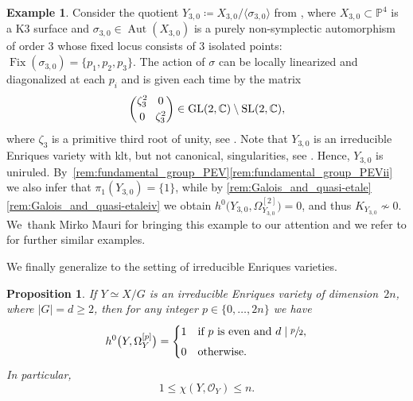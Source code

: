 \documentclass[JEP,XML,SOM,Unicode,published]{cedram}
\theoremstyle{plain}
\newtheorem{prop}[thm]{Proposition}
\theoremstyle{definition}
\newtheorem{exa}[thm]{Example}
\newcommand{\C}{\mathbb{C}}
\renewcommand{\P}{\mathbb{P}}
\newcommand{\OO}{\mathcal{O}}
\DeclareMathOperator{\Aut}{Aut}
\DeclareMathOperator{\Fix}{Fix}
\DeclareMathOperator{\GL}{GL}
\DeclareMathOperator{\SL}{SL}
\begin{document}
\begin{exa}
\label{example:uniruled_Enriques}
Consider the quotient $Y_{3,0} \coloneqq X_{3,0} / \langle \sigma_{3,0} \rangle$ from \cite[Prop.\,4.7]{AS08}, where $X_{3,0} \subset \P^4$ is a K3 surface and $\sigma_{3,0} \in \Aut(X_{3,0})$ is a purely non-symplectic automorphism of order $3$ whose fixed locus consists of $3$ isolated points:
$ \Fix(\sigma_{3,0}) = \{ p_1, p_2, p_3 \} $. The action of $\sigma$ can be locally linearized and diagonalized at each $p_i$ and is given each time by the matrix
\[\arraycolsep3.5pt
\begin{pmatrix}
\zeta_3^2 & 0 \\[0.25em]
0 & \zeta_3^2
\end{pmatrix}
\in \GL(2,\C) \setminus \SL(2,\C),
\]
where $\zeta_3$ is a primitive third root of unity, see \cite[\S 2]{AS08}.
Note that $Y_{3,0}$ is an irreducible Enriques variety with klt, but not canonical, singularities, see \cite[Prop.\,4.18, Th.\,4.20 and Rem.\,4.21(1)]{KM98}. Hence, $Y_{3,0}$ is uniruled. By~\autoref{rem:fundamental_group_PEV}\eqref{rem:fundamental_group_PEVii} we also infer that $\pi_1 (Y_{3,0}) = \{ 1 \}$, while by \autoref{rem:Galois_and_quasi-etale}\eqref{rem:Galois_and_quasi-etaleiv} we obtain
\hbox{$h^0 \bigl(Y_{3,0},\Omega_{Y_{3,0}}^{[2]} \bigr) \!=\! 0$}, and thus $K_{Y_{3,0}} \not\sim 0$. We~thank Mirko Mauri for bringing this example to our attention and we refer to \cite{AST11,BrandhorstHofmann23} for further similar examples.
\end{exa}

We finally generalize \cite[Prop.\,2.6]{OS11a} to the setting of irreducible Enriques varieties.

\begin{prop}
\label{prop:algebra_reflexive_forms_IEV}
If $Y \simeq X / G$ is an irreducible Enriques variety of dimension~$2n$, where $|G| = d \geq 2$, then for any integer $ p \in \{ 0, \dots, 2n \}$ we have
\[
h^0 \bigl(Y, \Omega_Y^{[p]} \bigr) =
\begin{cases}
1 & \text{if } p \text{ is even and } d \mid \sfrac{p}{2}, \\[0.4em]
0 & \text{otherwise}.
\end{cases}
\]
In particular,
\[
1 \leq \chi(Y, \OO_Y) \leq n.
\]
\end{prop}
\end{document}

